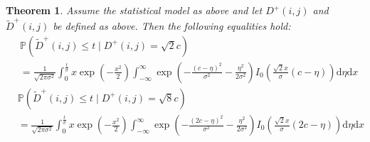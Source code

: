 \documentclass[a4paper,12pt]{article}
\theoremstyle{plain}
\newtheorem{theorem}{Theorem}[section]
\theoremstyle{definition}
\theoremstyle{remark}
\begin{document}
\begin{theorem}\label{thmcompprob}
	Assume the statistical model as above and let $D^+(i, j)$ and $\tilde{D}^+(i, j)$ be defined as above. Then the following equalities hold:
	\begin{equation}\label{eqcompprobupper}
		\begin{aligned}
			&\mathbb{P}(\tilde{D}^+(i, j) \leq t \mid D^+(i, j) = \sqrt{2} c) \\
			&= \frac{1}{\sqrt{2 \pi \sigma^2}} \int_0^\frac{t}{\sigma} x \exp \left( - \frac{x^2}{2} \right) \int_{-\infty}^\infty \exp \left( - \frac{(c - \eta)^2}{\sigma^2} - \frac{\eta^2}{2 \sigma^2} \right) I_0 \left( \frac{\sqrt{2} x}{\sigma} (c - \eta) \right) \mathrm{d}\eta \mathrm{d}x
		\end{aligned}
	\end{equation}
	\begin{equation}\label{eqcompproblower}
		\begin{aligned}
			&\mathbb{P}(\tilde{D}^+(i, j) \leq t \mid D^+(i, j) = \sqrt{8} c) \\
			&= \frac{1}{\sqrt{2 \pi \sigma^2}} \int_0^\frac{t}{\sigma} x \exp \left( - \frac{x^2}{2} \right) \int_{-\infty}^\infty \exp \left( - \frac{(2 c - \eta)^2}{\sigma^2} - \frac{\eta^2}{2 \sigma^2} \right) I_0 \left( \frac{\sqrt{2} x}{\sigma} (2 c - \eta) \right) \mathrm{d}\eta \mathrm{d}x
		\end{aligned}
	\end{equation}
\end{theorem}
\end{document}
